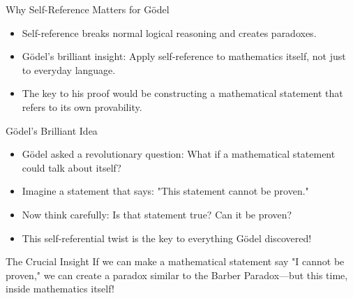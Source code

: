 \documentclass[aspectratio=169]{beamer}
\begin{document}
\begin{frame}{Why Self-Reference Matters for Gödel}

\begin{center}
\end{center}

\begin{itemize}
    \item Self-reference breaks normal logical reasoning and creates paradoxes.
    \item Gödel's brilliant insight: Apply self-reference to mathematics itself, not just to everyday language.
    \item The key to his proof would be constructing a mathematical statement that refers to its own provability.
\end{itemize}

\end{frame}

\begin{frame}{Gödel's Brilliant Idea}

\begin{itemize}
    \item Gödel asked a revolutionary question: What if a mathematical statement could talk about itself?
    \item Imagine a statement that says: "This statement cannot be proven."
    \item Now think carefully: Is that statement true? Can it be proven?
    \item This self-referential twist is the key to everything Gödel discovered!
\end{itemize}

\begin{alertblock}{The Crucial Insight}
If we can make a mathematical statement say "I cannot be proven," we can create a paradox similar to the Barber Paradox—but this time, inside mathematics itself!
\end{alertblock}

\end{frame}
\end{document}
